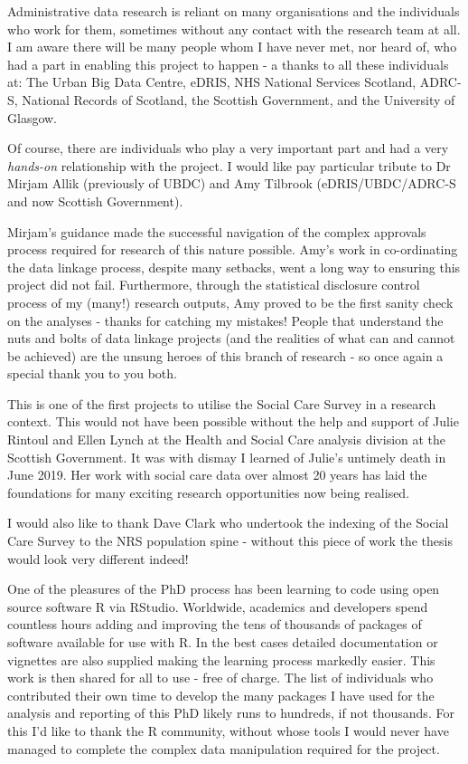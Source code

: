 \documentclass[12pt,a4paper,oneside,table]{report}
\begin{document}
Administrative data research is reliant on many organisations and the
individuals who work for them, sometimes without any contact with the
research team at all. I am aware there will be many people whom I have
never met, nor heard of, who had a part in enabling this project to
happen - a thanks to all these individuals at: The Urban Big Data
Centre, eDRIS, NHS National Services Scotland, ADRC-S, National Records
of Scotland, the Scottish Government, and the University of Glasgow.

Of course, there are individuals who play a very important part and had
a very \emph{hands-on} relationship with the project. I would like pay
particular tribute to Dr Mirjam Allik (previously of UBDC) and Amy
Tilbrook (eDRIS/UBDC/ADRC-S and now Scottish Government).

Mirjam's guidance made the successful navigation of the complex
approvals process required for research of this nature possible. Amy's
work in co-ordinating the data linkage process, despite many setbacks,
went a long way to ensuring this project did not fail. Furthermore,
through the statistical disclosure control process of my (many!)
research outputs, Amy proved to be the first sanity check on the
analyses - thanks for catching my mistakes! People that understand the
nuts and bolts of data linkage projects (and the realities of what can
and cannot be achieved) are the unsung heroes of this branch of research
- so once again a special thank you to you both.

This is one of the first projects to utilise the Social Care Survey in a
research context. This would not have been possible without the help and
support of Julie Rintoul and Ellen Lynch at the Health and Social Care
analysis division at the Scottish Government. It was with dismay I
learned of Julie's untimely death in June 2019. Her work with social
care data over almost 20 years has laid the foundations for many
exciting research opportunities now being realised.

I would also like to thank Dave Clark who undertook the indexing of the
Social Care Survey to the NRS population spine - without this piece of
work the thesis would look very different indeed!

One of the pleasures of the PhD process has been learning to code using
open source software R via RStudio. Worldwide, academics and developers
spend countless hours adding and improving the tens of thousands of
packages of software available for use with R. In the best cases
detailed documentation or vignettes are also supplied making the
learning process markedly easier. This work is then shared for all to
use - free of charge. The list of individuals who contributed their own
time to develop the many packages I have used for the analysis and
reporting of this PhD likely runs to hundreds, if not thousands. For
this I'd like to thank the R community, without whose tools I would
never have managed to complete the complex data manipulation required
for the project.
\end{document}
